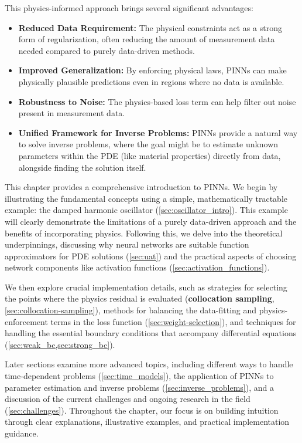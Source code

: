 This physics-informed approach brings several significant advantages:
\begin{itemize}
    \item \textbf{Reduced Data Requirement:} The physical constraints act as a strong form of regularization, often reducing the amount of measurement data needed compared to purely data-driven methods.
    \item \textbf{Improved Generalization:} By enforcing physical laws, PINNs can make physically plausible predictions even in regions where no data is available.
    \item \textbf{Robustness to Noise:} The physics-based loss term can help filter out noise present in measurement data.
    \item \textbf{Unified Framework for Inverse Problems:} PINNs provide a natural way to solve inverse problems, where the goal might be to estimate unknown parameters within the PDE (like material properties) directly from data, alongside finding the solution itself.
\end{itemize}

This chapter provides a comprehensive introduction to PINNs. We begin by illustrating the fundamental concepts using a simple, mathematically tractable example: the damped harmonic oscillator (\cref{sec:oscillator_intro}). This example will clearly demonstrate the limitations of a purely data-driven approach and the benefits of incorporating physics. Following this, we delve into the theoretical underpinnings, discussing why neural networks are suitable function approximators for PDE solutions (\cref{sec:uat}) and the practical aspects of choosing network components like activation functions (\cref{sec:activation_functions}).

We then explore crucial implementation details, such as strategies for selecting the points where the physics residual is evaluated (\textbf{collocation sampling}, \cref{sec:collocation-sampling}), methods for balancing the data-fitting and physics-enforcement terms in the loss function (\cref{sec:weight-selection}), and techniques for handling the essential boundary conditions that accompany differential equations (\cref{sec:weak_bc,sec:strong_bc}).

Later sections examine more advanced topics, including different ways to handle time-dependent problems (\cref{sec:time_models}), the application of PINNs to parameter estimation and inverse problems (\cref{sec:inverse_problems}), and a discussion of the current challenges and ongoing research in the field (\cref{sec:challenges}). Throughout the chapter, our focus is on building intuition through clear explanations, illustrative examples, and practical implementation guidance.


